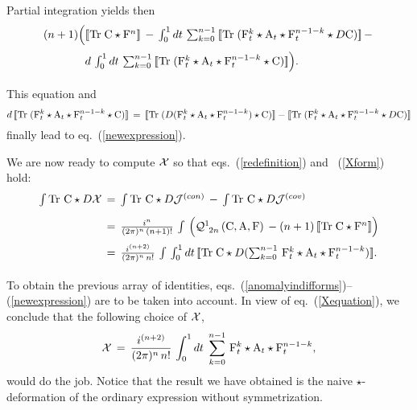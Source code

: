 \documentclass[a4paper,12pt]{article}
\def\cJ{{\cal J}}
\def\cQ{{\cal Q}}
\def\cX{{\cal X}}
\def\A{{\rm A}}
\def\C{{\rm C}}
\def\F{{\rm F}}
\def\bracl{ [\!\!\, [}
\def\bracr{ ]\!\!\, ]}
\begin{document}
Partial integration yields then 
\begin{displaymath}
\begin{array}{l}
{(n+1)\Big(\bracl{\rm Tr}\;\C\star \F^n\bracr\,-\,
\int_{0}^{1}dt\,\sum_{k=0}^{n-1}\,\bracl{\rm Tr}\;
(\F_t^{k}\star \A_t\star \F_t^{n-1-k}\star D\C)\bracr\,-\,}\\[9pt]
{\phantom{(n+1)\Big(} d\,\int_{0}^{1}dt\,\sum_{k=0}^{n-1}\,\bracl{\rm Tr}\;
(\F_t^{k}\star\A_t\star \F_t^{n-1-k}\star\C)\bracr\Big).}\\[9pt] 
\end{array}
\end{displaymath}
This equation and 
\begin{displaymath}
d\,\bracl{\rm Tr}\;
(\F_t^{k}\star\A_t\star \F_t^{n-1-k}\star\C)\bracr\,=\,
\bracl{\rm Tr}\;(D(\F_t^{k}\star\A_t\star \F_t^{n-1-k})\star\C)\bracr
-\bracl{\rm Tr}\;
(\F_t^{k}\star\A_t\star \F_t^{n-1-k}\star D\C)\bracr
\end{displaymath}
finally lead to eq.~(\ref{newexpression}).
 
We are now ready to compute $\cX$ so that eqs.~(\ref{redefinition}) and~ 
(\ref{Xform}) hold:
\begin{equation}
\begin{array}{l}
{\int {\rm Tr}\ \C\star D\cX\,=\,\int {\rm Tr}\ \C\star D\cJ^{(con)}\,-\,
\int {\rm Tr}\ \C\star D\cJ^{(cov)}}\\[9pt]
{\phantom{\int {\rm Tr}\ D\C\star\cX}
 \,=\,\frac{i^n}{(2\pi)^n\,(n+1)!}\,\int\,\Big( \cQ^{1}_{\;\,2n}
\,(\C,\A,\F)\,-(n+1)\,
\bracl{\rm Tr}\;\C\star \F^n\bracr\Big)}\\[9pt]
{\phantom{\int {\rm Tr}\ D\C\star\cX}
 \,=\,\frac{i^{(n+2)}}{(2\pi)^n\,n!}\,\int\,
\int_{0}^{1}dt\,\bracl{\rm Tr}\;\C\star D(
\sum_{k=0}^{n-1}\,\F_t^{k}\star\A_t\star \F_t^{n-1-k})\bracr.}\\[9pt]
\end{array}
\label{Xequation}
\end{equation}
To obtain the previous array of identities, eqs.~(\ref{anomalyindifforms})--
(\ref{newexpression}) are to be taken into account. In view of 
eq.~(\ref{Xequation}), we conclude that the following choice of $\cX$, 
\begin{equation} 
\cX\,=\,\frac{i^{(n+2)}}{(2\pi)^n\,n!}\,
\int_{0}^{1}dt\;
\sum_{k=0}^{n-1}\,\F_t^{k}\star\A_t\star \F_t^{n-1-k},
\label{ValueofX}
\end{equation}
would do the job. Notice that the result we have obtained is the naive 
$\star$-deformation of the ordinary expression without symmetrization.
\end{document}
